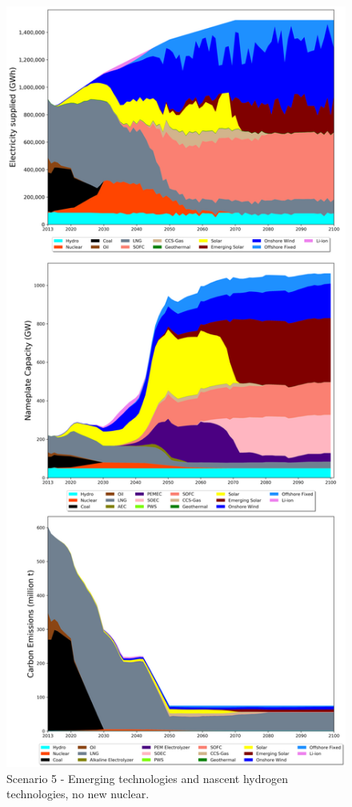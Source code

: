 \begin{figure}[h] 
\centering
\vspace*{-3cm}
\includegraphics[scale=0.41]{figures/lowtrltech_nonuc}
\caption{Scenario 5 - Emerging technologies and nascent hydrogen technologies, no new nuclear.}
\label{scen5}
\end{figure}

